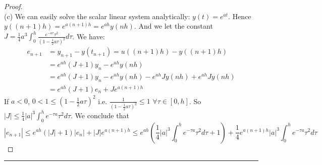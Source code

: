 \documentclass[a4paper, 10pt]{article}
\theoremstyle{definition}
\theoremstyle{hSol}
\begin{document}
\begin{proof}
~\\
(c) We can easily solve the scalar linear system analytically: $y(t)=e^{at}$. Hence $y((n+1)h)=e^{a(n+1)h}=e^{ah}y(nh)$. And we let the constant $J=\frac{1}{4}a^3\int_{0}^{h} \frac{e^{-a\tau}\tau^2}{(1-\frac{1}{2}a\tau)^2}d\tau$. We have:
\begin{equation}
  \begin{split}
    e_{n+1} &= y_{n+1} - y(t_{n+1}) = u((n+1)h)-y((n+1)h)\\
    &= e^{ah}\left(J+1\right)y_n - e^{ah}y(nh) \\
    &= e^{ah}\left(J+1\right)y_n - e^{ah}y(nh) - e^{ah}Jy(nh)  + e^{ah}Jy(nh)\\
    &= e^{ah}\left(J+1\right)e_n + J e^{a(n+1)h}
  \end{split}
\end{equation}
If $a<0$, $0<1\leq(1-\tfrac{1}{2}a\tau)^2$ i.e. $\frac{1}{(1-\tfrac{1}{2}a\tau)^2}\leq 1$ $\forall \tau \in [0,h]$. So $|J|\leq \frac{1}{4}|a|^3\int_{0}^h e^{-\tau a} \tau^2 d\tau$. We conclude that 
\begin{equation}
  |e_{n+1}| \leq e^{ah}\left(|J|+1\right)|e_n| + |J| e^{a(n+1)h} \leq e^{ah}\left(\frac{1}{4}|a|^3\int_{0}^h e^{-\tau a} \tau^2 d\tau+1\right) + \frac{1}{4}e^{a(n+1)h}|a|^3\int_{0}^h e^{-\tau a} \tau^2 d\tau
\end{equation}
\end{proof}







\noindent\rule{16cm}{0.4pt}
\end{document}
